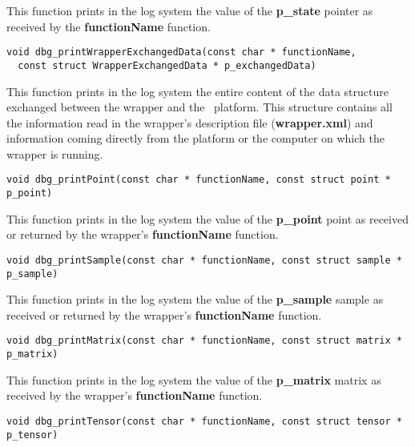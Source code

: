 This function prints in the log system the value of the {\bf p\_state} pointer as received by the {\bf functionName} function.

\lstset{language=C++, basicstyle=\normalsize}
\begin{lstlisting}[frame=TRBL]
  void dbg_printWrapperExchangedData(const char * functionName,
  const struct WrapperExchangedData * p_exchangedData)
\end{lstlisting}

This function prints in the log system the entire content of the data structure exchanged between the wrapper and the \OT\ platform. This structure contains all the information read in the wrapper's description file ({\bf wrapper.xml}) and information coming directly from the platform or the computer on which the wrapper is running.

\lstset{language=C++, basicstyle=\normalsize}
\begin{lstlisting}[frame=TRBL]
  void dbg_printPoint(const char * functionName, const struct point * p_point)
\end{lstlisting}

This function prints in the log system the value of the {\bf p\_point} point as received or returned by the wrapper's {\bf functionName} function.

\lstset{language=C++, basicstyle=\normalsize}
\begin{lstlisting}[frame=TRBL]
  void dbg_printSample(const char * functionName, const struct sample * p_sample)
\end{lstlisting}

This function prints in the log system the value of the {\bf p\_sample} sample as received or returned by the wrapper's {\bf functionName} function.

\lstset{language=C++, basicstyle=\normalsize}
\begin{lstlisting}[frame=TRBL]
  void dbg_printMatrix(const char * functionName, const struct matrix * p_matrix)
\end{lstlisting}

This function prints in the log system the value of the {\bf p\_matrix} matrix as received by the wrapper's {\bf functionName} function.

\lstset{language=C++, basicstyle=\normalsize}
\begin{lstlisting}[frame=TRBL]
  void dbg_printTensor(const char * functionName, const struct tensor * p_tensor)
\end{lstlisting}

